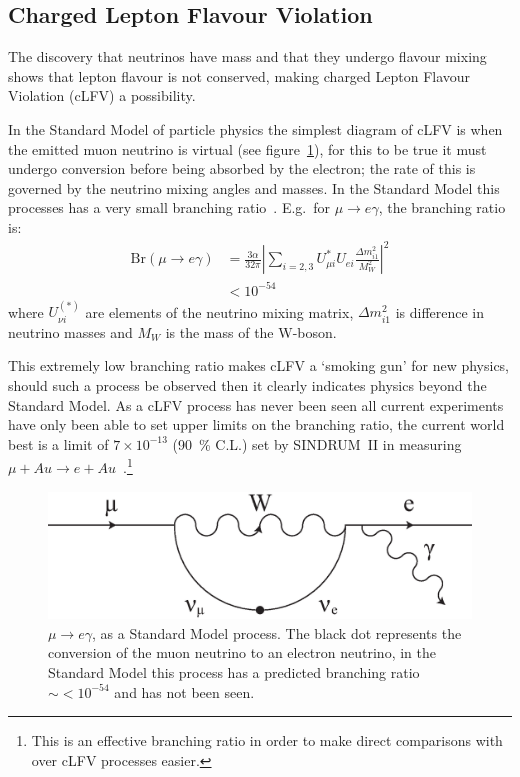 \subsection{Charged Lepton Flavour Violation} %
\label{sec:charged_lepton_flavour_violation}
The discovery that neutrinos have mass and that they undergo flavour mixing shows that lepton flavour is not conserved, making charged Lepton Flavour Violation (cLFV) a possibility. 

In the Standard Model of particle physics the simplest diagram of cLFV is when the emitted muon neutrino is virtual (see figure~\ref{fig:images_cLFV_mu-e_conversion}), for this to be true it must undergo conversion before being absorbed by the electron; the rate of this is governed by the neutrino mixing angles and masses. In the Standard Model this processes has a very small branching ratio~\cite{effective_lagrangian_for_clfv}. E.g.\ for \( \mu\rightarrow e\gamma \), the branching ratio is: 
\begin{align}
  \text{Br}(\mu\rightarrow e\gamma) 
    &= \frac{3\alpha}{32\pi}
      \left|\sum\limits_{i=2,3} U^*_{\mu i} U_{ei}
            \frac{\Delta m^2_{i1}}{M^2_W}
     \right|^2 \\
    &< 10^{-54} \label{equ:clfv_branching_ratio}
\end{align}
where \( U_{\nu i}^{(*)} \) are elements of the neutrino mixing matrix, \(\Delta m^2_{i1}\) is difference in neutrino masses and \(M_{W}\) is the mass of the W-boson.

This extremely low branching ratio makes cLFV a `smoking gun' for new physics, should such a process be observed then it clearly indicates physics beyond the Standard Model. As a cLFV process has never been seen all current experiments have only been able to set upper limits on the branching ratio, the current world best is a limit of \(7\times10^{-13}\) (90~\% C.L.) set by SINDRUM~II in measuring \(\mu+Au\rightarrow e+Au\)~\cite{sindrum_2_mu_ag_e}.\footnote{This is an effective branching ratio in order to make direct comparisons with over cLFV processes easier.}

\begin{figure}[hptb]
  \centering
    \includegraphics[width=.7\textwidth]{images/cLFV_mu-e_conversion.eps}
  \caption{\(\mu\rightarrow e\gamma\), as a Standard Model process. The black dot represents the conversion of the muon neutrino to an electron neutrino, in the Standard Model this process has a predicted branching ratio \(\sim <10^{-54} \) and has not been seen.}
  \label{fig:images_cLFV_mu-e_conversion}
\end{figure}

